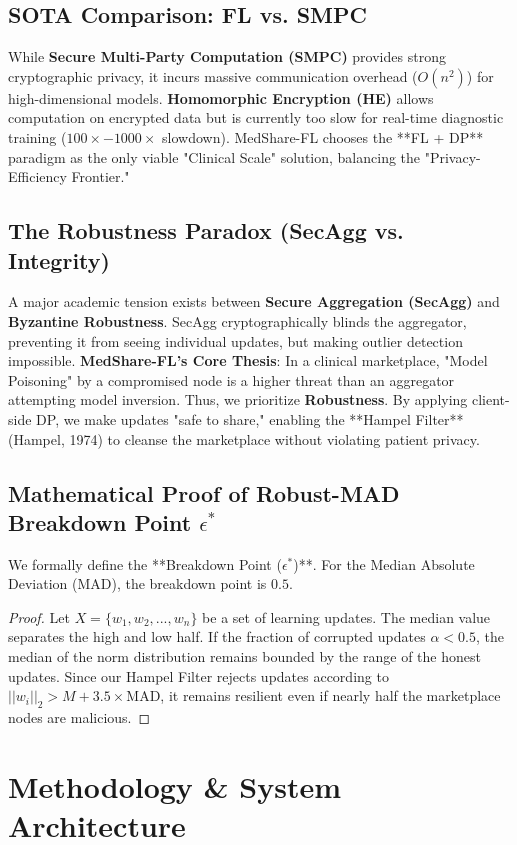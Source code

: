 \documentclass[10pt, a4paper, twocolumn]{article}
\begin{document}
\subsection{SOTA Comparison: FL vs. SMPC}
While \textbf{Secure Multi-Party Computation (SMPC)} provides strong cryptographic privacy, it incurs massive communication overhead ($O(n^2)$) for high-dimensional models. \textbf{Homomorphic Encryption (HE)} allows computation on encrypted data but is currently too slow for real-time diagnostic training ($100 \times - 1000 \times$ slowdown). MedShare-FL chooses the **FL + DP** paradigm as the only viable "Clinical Scale" solution, balancing the "Privacy-Efficiency Frontier."

\subsection{The Robustness Paradox (SecAgg vs. Integrity)}
A major academic tension exists between \textbf{Secure Aggregation (SecAgg)} and \textbf{Byzantine Robustness}. SecAgg cryptographically blinds the aggregator, preventing it from seeing individual updates, but making outlier detection impossible. \textbf{MedShare-FL’s Core Thesis}: In a clinical marketplace, "Model Poisoning" by a compromised node is a higher threat than an aggregator attempting model inversion. Thus, we prioritize \textbf{Robustness}. By applying client-side DP, we make updates "safe to share," enabling the **Hampel Filter** (Hampel, 1974) to cleanse the marketplace without violating patient privacy.

\subsection{Mathematical Proof of Robust-MAD Breakdown Point \texorpdfstring{$\epsilon^*$}{epsilon*}}
We formally define the **Breakdown Point ($\epsilon^*$)**. For the Median Absolute Deviation (MAD), the breakdown point is $0.5$.
\begin{proof}
Let $X = \{w_1, w_2, ..., w_n\}$ be a set of learning updates. The median value separates the high and low half. If the fraction of corrupted updates $\alpha < 0.5$, the median of the norm distribution remains bounded by the range of the honest updates. Since our Hampel Filter rejects updates according to $||w_i||_2 > M + 3.5 \times \text{MAD}$, it remains resilient even if nearly half the marketplace nodes are malicious.
\end{proof}

\section{Methodology \& System Architecture}
\end{document}
